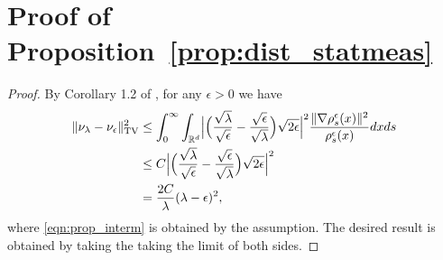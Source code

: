 



\section{Proof of Proposition~\ref{prop:dist_statmeas}}

%
\begin{proof}
By Corollary 1.2 of \cite{bogachev2016distances}, for any $\epsilon > 0$ we have 
\begin{align}
\| \nu_\lambda - \nu_\epsilon \|_{\textnormal{TV}}^2 &\leq \int_0^\infty \int_{\mathbb{R}^d} \Bigl| \Bigl(\frac{\sqrt{\lambda}}{\sqrt{\epsilon}}- \frac{\sqrt{\epsilon}}{\sqrt{\lambda}} \Bigr) \sqrt{2\epsilon}  \Bigr|^2 \frac{\|\nabla \rho^\epsilon_s(x)\|^2}{\rho^\epsilon_s(x)}  dx ds \\
&\leq  C \Bigl| \Bigl(\frac{\sqrt{\lambda}}{\sqrt{\epsilon}}- \frac{\sqrt{\epsilon}}{\sqrt{\lambda}} \Bigr) \sqrt{2\epsilon}  \Bigr|^2 \label{eqn:prop_interm} \\
&= \frac{2C}{\lambda} (\lambda - \epsilon)^2,
\end{align}
where \eqref{eqn:prop_interm} is obtained by the assumption. The desired result is obtained by taking the taking the limit of both sides. 
\end{proof}
%

